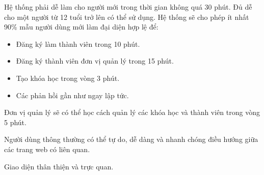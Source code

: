 \documentclass[./../main_file.tex]{subfiles}
\begin{document}
	
Hệ thống phải dễ làm cho người mới trong thời gian không quá 30 phút. Đủ dễ cho một người từ 12 tuổi trở lên có thể sử dụng.
Hệ thống sẽ cho phép ít nhất 90\% mẫu người dùng mới làm đại diện hợp lệ để:
\begin{itemize}
	\item Đăng ký làm thành viên trong 10 phút.
	\item Đăng ký thành viên đơn vị quản lý trong 15 phút.
	\item Tạo khóa học trong vòng 3 phút.
	\item Các phản hồi gần như ngay lập tức.
\end{itemize}

Đơn vị quản lý sẽ có thể học cách quản lý các khóa học và thành viên trong vòng 5 phút.

Người dùng thông thường có thể tự do, dễ dàng và nhanh chóng điều hướng giữa các trang web có liên quan.

Giao diện thân thiện và trực quan.

	
\end{document}
